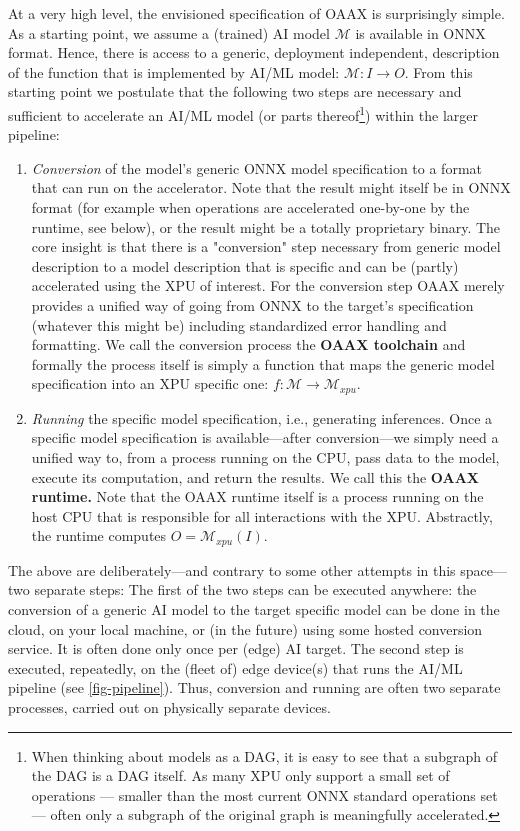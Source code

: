 \documentclass{article}
\begin{document}
At a very high level, the envisioned specification of OAAX is surprisingly simple. As a starting point, we assume a (trained) AI model $\mathcal{M}$ is available in ONNX format. Hence, there is access to a generic, deployment independent, description of the function that is implemented by AI/ML model: $\mathcal{M} \colon I \to O$.  From this starting point we postulate that  the following two steps are necessary and sufficient to accelerate an AI/ML model (or parts thereof\footnote{When thinking about models as a DAG, it is easy to see that a subgraph of the DAG is a DAG itself. As many XPU only support a small set of operations --- smaller than the most current ONNX standard operations set --- often only a subgraph of the original graph is meaningfully accelerated.}) within the larger pipeline:

\begin{enumerate}
\item \emph{Conversion} of the model's generic ONNX model specification to a format that can run on the accelerator. Note that the result might itself be in ONNX format (for example when operations are accelerated one-by-one by the runtime, see below), or the result might be a totally proprietary binary. The core insight is that there is a "conversion" step necessary from generic model description to a model description that is specific and can be (partly) accelerated using the XPU of interest. For the conversion step OAAX merely provides a unified way of going from ONNX to the target's specification (whatever this might be) including standardized error handling and formatting. We call the conversion process the \textbf{OAAX toolchain} and formally the process itself is simply a function that maps the generic model specification into an XPU specific one: $f \colon \mathcal{M} \to \mathcal{M}_{xpu}$.
\item \emph{Running} the specific model specification, i.e., generating inferences. Once a specific model specification is available---after conversion---we simply need a unified way to, from a process running on the CPU, pass data to the model, execute its computation, and return the results. We call this the \textbf{OAAX runtime.} Note that the OAAX runtime itself is a process running on the host CPU that is responsible for all interactions with the XPU. Abstractly, the runtime computes $O = \mathcal{M}_{xpu}(I)$.
\end{enumerate}

The above are deliberately---and contrary to some other attempts in this space---two separate steps: The first of the two steps can be executed anywhere: the conversion of a generic AI model to the target specific model can be done in the cloud, on your local machine, or (in the future) using some hosted conversion service. It is often done only once per (edge) AI target. The second step is executed, repeatedly, on the (fleet of) edge device(s) that runs the AI/ML pipeline (see \ref{fig-pipeline}). Thus, conversion and running are often two separate processes, carried out on physically separate devices.
\end{document}
